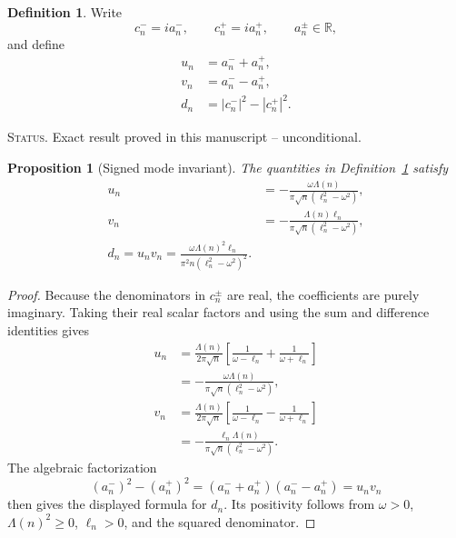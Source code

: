 \documentclass[11pt]{amsart}
\numberwithin{equation}{section}
\theoremstyle{plain}
\newtheorem{proposition}[theorem]{Proposition}
\theoremstyle{definition}
\newtheorem{definition}[theorem]{Definition}
\theoremstyle{remark}
\newcommand{\1}{\mathbf{1}}
\newcommand{\statusnote}[1]{%
  \par\smallskip\noindent
  \begingroup\footnotesize\textsc{Status.} #1\endgroup
  \par\smallskip}
\begin{document}
\begin{definition}
\label{def:u_v_d}
Write
\begin{equation}
c_n^-=ia_n^-,
\qquad
c_n^+=ia_n^+,
\qquad
a_n^\pm\in\mathbb R,
\label{eq:a_pm_definition}
\end{equation}
and define
\begin{align}
u_n
&=
a_n^-+a_n^+,
\label{eq:un_definition}
\\
v_n
&=
a_n^--a_n^+,
\label{eq:vn_definition}
\\
d_n
&=
|c_n^-|^2-|c_n^+|^2.
\label{eq:dn_definition}
\end{align}
\end{definition}

\statusnote{Exact result proved in this manuscript -- unconditional.}
\begin{proposition}[Signed mode invariant]
\label{prop:signed_mode_invariant}
The quantities in Definition~\ref{def:u_v_d} satisfy
\begin{align}
u_n
&=
-\frac{\omega\Lambda(n)}
{\pi\sqrt n(\ell_n^2-\omega^2)},
\label{eq:un_formula}
\\
v_n
&=
-\frac{\Lambda(n)\ell_n}
{\pi\sqrt n(\ell_n^2-\omega^2)},
\label{eq:vn_formula}
\\
\boxed{
d_n=u_nv_n
=
\frac{\omega\Lambda(n)^2\ell_n}
{\pi^2n(\ell_n^2-\omega^2)^2}.
}
\label{eq:dn_formula}
\end{align}
\end{proposition}

\begin{proof}
Because the denominators in \(c_n^\pm\) are real, the coefficients are
purely imaginary.  Taking their real scalar factors and using the sum and
difference identities gives
\begin{align}
u_n
&=
\frac{\Lambda(n)}{2\pi\sqrt n}
\left[
\frac1{\omega-\ell_n}+\frac1{\omega+\ell_n}
\right]
\label{eq:un_proof_one}
\\
&=
-\frac{\omega\Lambda(n)}
{\pi\sqrt n(\ell_n^2-\omega^2)},
\label{eq:un_proof_two}
\\
v_n
&=
\frac{\Lambda(n)}{2\pi\sqrt n}
\left[
\frac1{\omega-\ell_n}-\frac1{\omega+\ell_n}
\right]
\label{eq:vn_proof_one}
\\
&=
-\frac{\ell_n\Lambda(n)}
{\pi\sqrt n(\ell_n^2-\omega^2)}.
\label{eq:vn_proof_two}
\end{align}
The algebraic factorization
\begin{equation}
(a_n^-)^2-(a_n^+)^2
=
(a_n^-+a_n^+)(a_n^--a_n^+)
=u_nv_n
\label{eq:dn_difference_squares}
\end{equation}
then gives the displayed formula for \(d_n\).  Its positivity follows
from \(\omega>0\), \(\Lambda(n)^2\geq0\), \(\ell_n>0\), and the squared
denominator.
\end{proof}
\end{document}
